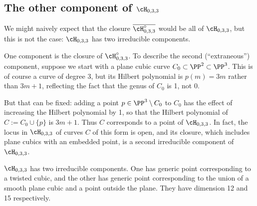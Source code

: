 \subsection{The other component of $\cH_{0,3,3}$}

We might naively expect that the closure $\overline{\cH^\circ_{0,3,3}}$ would be all of $\cH_{0,3,3}$, but this is not the case:  $\cH_{0,3,3}$ has two irreducible components. 

One component is the closure of $\cH^\circ_{0,3,3}$. To describe the second (``extraneous'') component, suppose we start with a plane cubic curve $C_0 \subset \PP^2 \subset \PP^3$. This is of course a curve of degree 3, but its Hilbert polynomial is $p(m) = 3m$ rather than $3m+1$, reflecting the fact that the genus of $C_0$ is 1, not 0.

But that can be fixed: adding a point $p \in \PP^3 \setminus C_0$ to $C_0$ has the effect of increasing the Hilbert polynomial by 1, so that the Hilbert polynomial of $C := C_0\cup \{p\}$ is $3m+1$. Thus $C$  corresponds to a point of $\cH_{0,3,3}$. In fact, the locus in $\cH_{0,3,3}$ of curves $C$ of this form is open, and its closure, which includes plane cubics with an embedded point, is a second irreducible component of $\cH_{0,3,3}$. 


\begin{theorem}
$\cH_{0,3,3}$ has two irreducible components. One has generic point corresponding to  a twisted cubic,
and the other has generic point corresponding to the union of a smooth plane cubic and a point outside the plane.
They have dimension 12 and 15 respectively.
\end{theorem}

